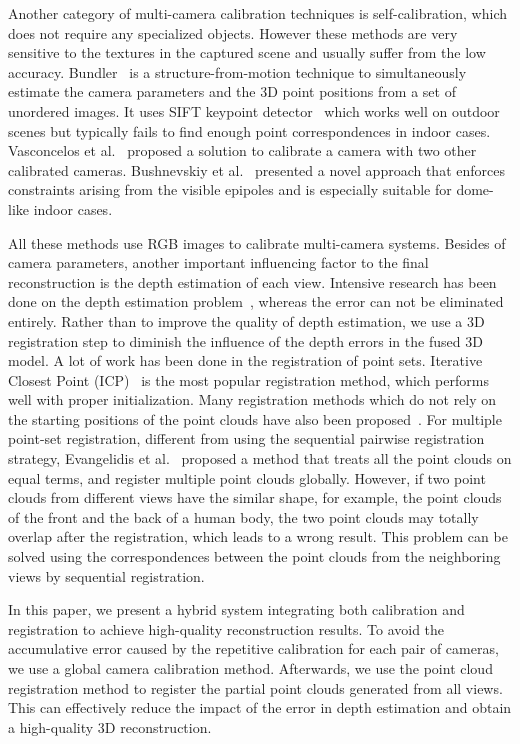 Another category of multi-camera calibration techniques is self-calibration, which does not require any specialized objects.
However these methods are very sensitive to the textures in the captured scene and usually suffer from the low accuracy.
%
Bundler~\cite{snavely2006photo} is a structure-from-motion technique to simultaneously estimate the camera parameters and the 3D point positions from a set of unordered images.
%
It uses SIFT keypoint detector~\cite{lowe2004distinctive} which works well on outdoor scenes but typically fails to find enough point correspondences in indoor cases.
%
Vasconcelos et al.~\cite{vasconcelos2012minimal} proposed a solution to calibrate a camera with two other calibrated cameras.
Bushnevskiy et al.~\cite{bushnevskiy2016multicamera} presented a novel approach that enforces constraints arising from the visible epipoles and is especially suitable for dome-like indoor cases.

All these methods use RGB images to calibrate multi-camera systems.
%
Besides of camera parameters, another important influencing factor to the final reconstruction is the depth estimation of each view.
Intensive research has been done on the depth estimation problem~\cite{scharstein,Bleyer2011PatchMatch}, whereas the error can not be eliminated entirely.
%
Rather than to improve the quality of depth estimation, we use a 3D registration step to diminish the influence of the depth errors in the fused 3D model.
%
A lot of work has been done in the registration of point sets.
Iterative Closest Point (ICP)~\cite{Besl1992A} is the most popular registration method, which performs well with proper initialization.
%
Many registration methods which do not rely on the starting positions of the point clouds have also been proposed~\cite{Aiger:2008:CSR:1360612.1360684,5152473}.
%
For multiple point-set registration, different from using the sequential pairwise registration strategy, Evangelidis et al.~\cite{Evangelidis-ECCV-2014} proposed a method that treats all the point clouds on equal terms, and register multiple point clouds globally.
%
%
However, if two point clouds from different views have the similar shape, for example, the point clouds of the front and the back of a human body, the two point clouds may totally overlap after the registration, which leads to a wrong result.
This problem can be solved using the correspondences between the point clouds from the neighboring views by sequential registration.
%

In this paper, we present a hybrid system integrating both calibration and registration to achieve high-quality reconstruction results. To avoid the accumulative error caused by the repetitive calibration for each pair of cameras, we use a global camera calibration method.
Afterwards, we use the point cloud registration method to register the partial point clouds generated from all views.
This can effectively reduce the impact of the error in depth estimation and obtain a high-quality 3D reconstruction.






